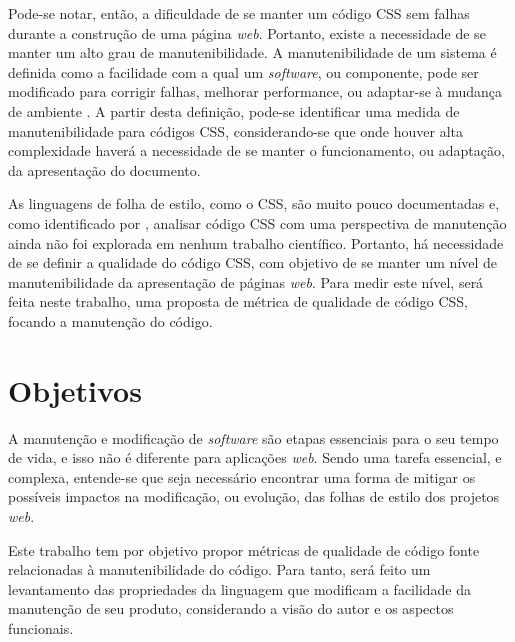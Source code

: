 Pode-se notar, então, a dificuldade de se manter um código CSS sem falhas durante a construção de uma página \textit{web}. Portanto, existe a necessidade de se manter um alto grau de manutenibilidade. A manutenibilidade de um sistema é definida como a facilidade com a qual um \textit{software}, ou componente, pode ser modificado para corrigir falhas, melhorar performance, ou adaptar-se à mudança de ambiente \cite{Ieee1990}. A partir desta definição, pode-se identificar uma medida de manutenibilidade para códigos CSS, considerando-se que onde houver alta complexidade haverá a necessidade de se manter o funcionamento, ou adaptação, da apresentação do documento.

As linguagens de folha de estilo, como o CSS, são muito pouco documentadas \cite{Marden1999,Geneves2012,Quint2007} e, como identificado por , analisar código CSS com uma perspectiva de manutenção ainda não foi explorada em nenhum trabalho científico. Portanto, há necessidade de se definir a qualidade do código CSS, com objetivo de se manter um nível de manutenibilidade da apresentação de páginas \textit{web}. Para medir este nível, será feita neste trabalho, uma proposta de métrica de qualidade de código CSS, focando a manutenção do código.

\section{Objetivos}
\label{sec:obj}

A manutenção e modificação de \textit{software} são etapas essenciais para o seu tempo de vida, e isso não é diferente para aplicações \textit{web}. Sendo uma tarefa essencial, e complexa, entende-se que seja necessário encontrar uma forma de mitigar os possíveis impactos na modificação, ou evolução, das folhas de estilo dos projetos \textit{web}.

Este trabalho tem por objetivo propor métricas de qualidade de código fonte relacionadas à manutenibilidade do código. Para tanto, será feito um levantamento das propriedades da linguagem que modificam a facilidade da manutenção de seu produto, considerando a visão do autor e os aspectos funcionais. 